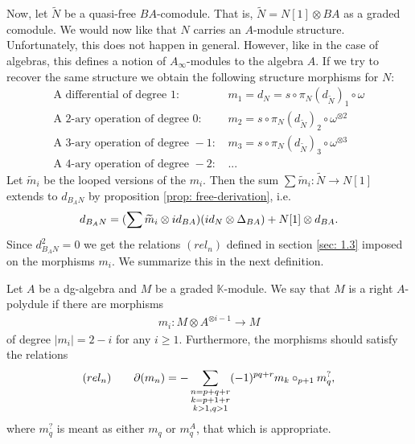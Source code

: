 \documentclass[../thesis.tex]{subfiles}
\begin{document}
            Now, let $\widetilde{N}$ be a quasi-free $BA$-comodule. That is, $\widetilde{N} = N[1] \otimes BA$ as a graded comodule. We would now like that $N$ carries an $A$-module structure. Unfortunately, this does not happen in general. However, like in the case of algebras, this defines a notion of $A_\infty$-modules to the algebra $A$. If we try to recover the same structure we obtain the following structure morphisms for $N$:
            \begin{align*}
                \text{A differential of degree }1\text{: }& m_1 = d_{N} = s\circ \pi_N (d_{\widetilde{N}})_1 \circ \omega\\
                \text{A 2-ary operation of degree }0\text{: }& m_2 = s\circ \pi_N (d_{\widetilde{N}})_2 \circ \omega^{\otimes 2}\\
                \text{A 3-ary operation of degree }-1\text{: }& m_3 = s\circ \pi_N (d_{\widetilde{N}})_3 \circ \omega^{\otimes 3}\\
                \text{A 4-ary operation of degree }-2\text{: }& \text{...}
            \end{align*}
            Let $\widetilde{m}_i$ be the looped versions of the $m_i$. Then the sum $\sum \widetilde{m}_i : \widetilde{N} \rightarrow N[1]$ extends to $d_{B_AN}$ by proposition \ref{prop: free-derivation}, i.e. 
            \begin{align*}
                d_{B_AN} = (\sum \widetilde{m}_i \otimes id_{BA})(id_N \otimes \Delta_{BA}) + N[1]\otimes d_{BA}\tt{.}
            \end{align*}
            Since $d_{B_AN}^2 = 0$ we get the relations $(rel_n)$ defined in section \ref{sec: 1.3} imposed on the morphisms $m_i$. We summarize this in the next definition.

            \begin{definition}[$A$-polydule]
                Let $A$ be a dg-algebra and $M$ be a graded $\mathbb{K}$-module. We say that $M$ is a right $A$-polydule if there are morphisms
                \begin{align}
                    m_i : M \otimes A^{\otimes i - 1} \rightarrow M
                \end{align}
                of degree $|m_i| = 2 - i$ for any $i \geq 1$. Furthermore, the morphisms should satisfy the relations
                \begin{align*}
                    (rel_n) \qquad \partial(m_n) = - \sum_{\substack{n = p + q + r \\ k = p + 1 + r \\ k > 1, q > 1}}(-1)^{pq+r}m_k\circ_{p+1}m_q^?\tt{,}
                \end{align*}
                where $m_q^?$ is meant as either $m_q$ or $m_q^A$, that which is appropriate.
            \end{definition}
            
\end{document}
